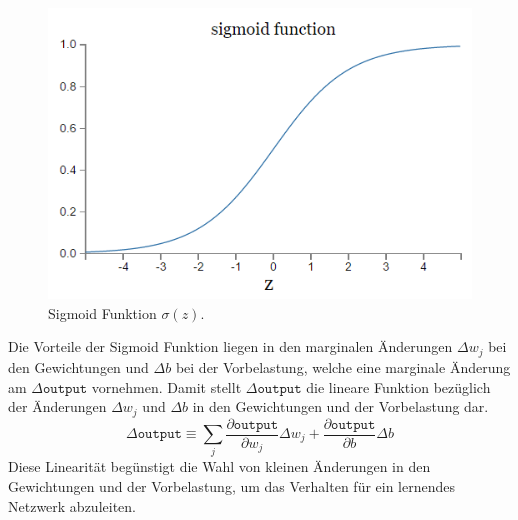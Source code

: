 \begin{figure}[hbt]
	\centering
	\includegraphics[scale=0.6]{Bilder/sigmoid_plot}
	\caption{Sigmoid Funktion $\sigma(z)$.} 
	\label{fig:sigmoid_plot} 
\end{figure}

\noindent
Die Vorteile der Sigmoid Funktion liegen in den marginalen Änderungen $\Delta w_j$ bei den Gewichtungen und $\Delta b$ bei der Vorbelastung, welche eine marginale Änderung am $\Delta\mathtt{output}$ vornehmen. Damit stellt $\Delta\mathtt{output}$ die lineare Funktion bezüglich der Änderungen  $\Delta w_j$ und $\Delta b$ in den Gewichtungen und der Vorbelastung dar.
\begin{equation}
	\Delta\mathtt{output} \equiv \sum_{j}{\frac{\partial\mathtt{output}}{\partial w_j}\Delta w_j+\frac{\partial\mathtt{output}}{\partial b}\Delta b}
\end{equation}
Diese Linearität begünstigt die Wahl von kleinen Änderungen in den Gewichtungen und der Vorbelastung, um das Verhalten für ein lernendes Netzwerk abzuleiten. \\

